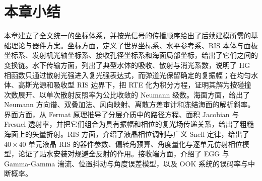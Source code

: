 \section{本章小结}

本章建立了全文统一的坐标体系，并按光信号的传播顺序给出了后续建模所需的基础理论与器件方案。坐标方面，定义了世界坐标系、水平参考系、RIS 本体与面板坐标系、发射机光轴坐标系、接收孔径坐标系和海面局部坐标，给出了它们之间的变换链。水下传输方面，列出了典型水体的吸收、散射与消光系数，说明了 HG 相函数只通过散射光强进入复光强表达式，而弹道光保留确定的复振幅；在均匀水体、高斯光源和吸收型 RIS 边界下，把 RTE 化为积分方程，证明其解为按碰撞次数展开、以单次散射反照率为公比收敛的 Neumann 级数。海面方面，给出了 Neumann 方向谱、双叠加法、风向映射、离散方差审计和冻结海面的解析斜率。界面方面，从 Fermat 原理推导了分层介质中的路径方程、面积 Jacobian 与 Fresnel 透射率，并把它们组合为具有振幅和相位的复光场传递关系，给出了粗糙海面上的矢量折射。RIS 方面，介绍了液晶相位调制与广义 Snell 定律，给出了 $40\times40$ 单元液晶 RIS 的器件参数、偏转角预算、角度量化与逐单元仿射相位模型，论证了贴水安装对规避全反射的作用。接收端方面，介绍了 EGG 与 Gamma-Gamma 湍流、位置抖动与角度误差模型，以及 OOK 系统的误码率与中断概率。
